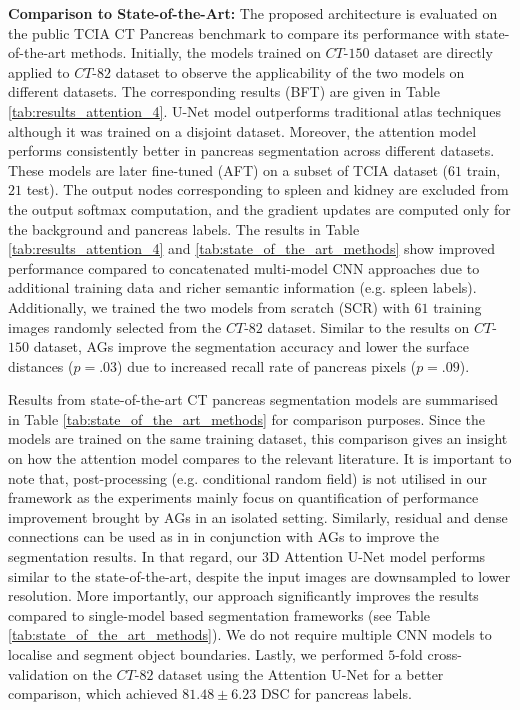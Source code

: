\documentclass{article}
\begin{document}
\textbf{Comparison to State-of-the-Art:} The proposed architecture is evaluated on the public TCIA CT Pancreas benchmark to compare its performance with state-of-the-art methods. Initially, the models trained on $CT$-$150$ dataset are directly applied to $CT$-$82$ dataset to observe the applicability of the two models on different datasets. The corresponding results (BFT) are given in Table \ref{tab:results_attention_4}. U-Net model outperforms traditional atlas techniques \cite{wolz2013automated} although it was trained on a disjoint dataset. Moreover, the attention model performs consistently better in pancreas segmentation across different datasets. These models are later fine-tuned (AFT) on a subset of TCIA dataset ($61$ train, $21$ test). The output nodes corresponding to spleen and kidney are excluded from the output softmax computation, and the gradient updates are computed only for the background and pancreas labels. The results in Table \ref{tab:results_attention_4} and \ref{tab:state_of_the_art_methods} show improved performance compared to concatenated multi-model CNN approaches \cite{cai2017improving, roth2018media, zhou2017fixed} due to additional training data and richer semantic information (e.g. spleen labels). Additionally, we trained the two models from scratch (SCR) with $61$ training images randomly selected from the $CT$-$82$ dataset. Similar to the results on $CT$-$150$ dataset, AGs improve the segmentation accuracy and lower the surface distances ($p = .03$) due to increased recall rate of pancreas pixels  ($p = .09$). 

Results from state-of-the-art CT pancreas segmentation models are summarised in Table \ref{tab:state_of_the_art_methods} for comparison purposes. Since the models are trained on the same training dataset, this comparison gives an insight on how the attention model compares to the relevant literature. It is important to note that, post-processing (e.g. conditional random field) is not utilised in our framework as the experiments mainly focus on quantification of performance improvement brought by AGs in an isolated setting. Similarly, residual and dense connections can be used as in \cite{gibson2017towards} in conjunction with AGs to improve the segmentation results. In that regard, our 3D Attention U-Net model performs similar to the state-of-the-art, despite the input images are downsampled to lower resolution. More importantly, our approach significantly improves the results compared to single-model based segmentation frameworks (see Table \ref{tab:state_of_the_art_methods}). We do not require multiple CNN models to localise and segment object boundaries. Lastly, we performed $5$-fold cross-validation on the $CT$-$82$ dataset using the Attention U-Net for a better comparison, which achieved $81.48\pm6.23$ DSC for pancreas labels. 
\end{document}
